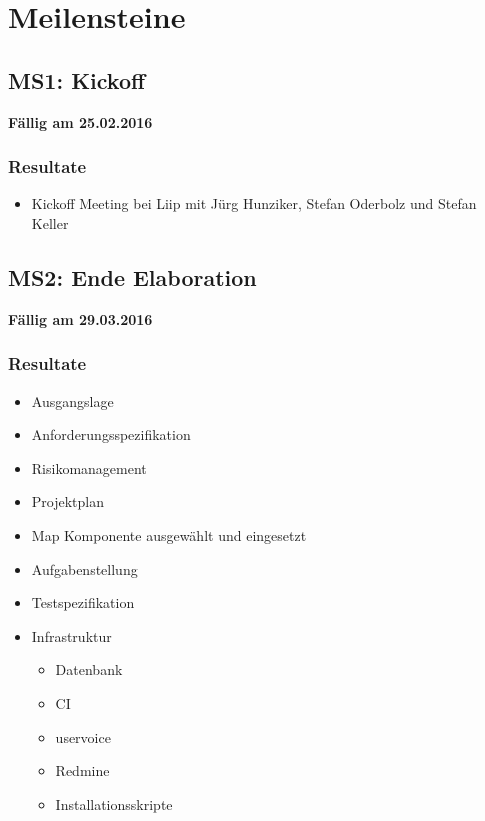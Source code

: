 \section{Meilensteine}
\label{pm-ms}
\subsection{MS1: Kickoff}
\label{pm-ms1}
\textbf{Fällig am 25.02.2016}
\subsubsection{Resultate}
\begin{itemize}
	\item Kickoff Meeting bei Liip mit Jürg Hunziker, Stefan Oderbolz und Stefan Keller
\end{itemize}

\subsection{MS2: Ende Elaboration}
\label{pm-ms2}
\textbf{Fällig am 29.03.2016}
\subsubsection{Resultate}
\begin{itemize}
	\item Ausgangslage
	\item Anforderungsspezifikation
	\item Risikomanagement
	\item Projektplan
	\item Map Komponente ausgewählt und eingesetzt
	\item Aufgabenstellung
	\item Testspezifikation
	\item Infrastruktur
	\begin{itemize}
		\item Datenbank
		\item CI
		\item uservoice
		\item Redmine
		\item Installationsskripte
	\end{itemize}
\end{itemize}

